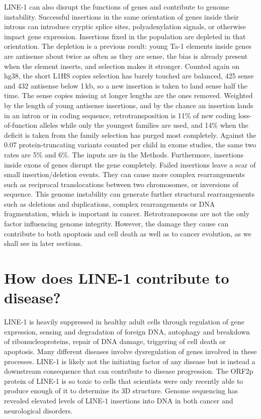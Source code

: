 \documentclass[11pt,twocolumn,twoside]{extarticle}
\begin{document}
LINE-1 can also disrupt the functions of genes and contribute to genome instability. Successful insertions in the same orientation of genes inside their introns can introduce cryptic splice sites, polyadenylation signals, or otherwise impact gene expression\cite{perepelitsa}. Insertions fixed in the population are depleted in that orientation. The depletion is a previous result: young Ta-1 elements inside genes are antisense about twice as often as they are sense\cite{boissinot}, the bias is already present when the element inserts, and selection makes it stronger\cite{sultana}. Counted again on hg38, the short L1HS copies selection has barely touched are balanced, 425 sense and 432 antisense below 1\,kb, so a new insertion is taken to land sense half the time. The sense copies missing at longer lengths are the ones removed. Weighted by the length of young antisense insertions, and by the chance an insertion lands in an intron or in coding sequence, retrotransposition is 11\% of new coding loss-of-function alleles while only the youngest families are used, and 14\% when the deficit is taken from the family selection has purged most completely. Against the 0.07 protein-truncating variants counted per child in exome studies, the same two rates are 5\% and 6\%. The inputs are in the Methods. Furthermore, insertions inside exons of genes disrupt the gene completely\cite{cajuso}. Failed insertions leave a scar of small insertion/deletion events\cite{zhang}. They can cause more complex rearrangements such as reciprocal translocations between two chromosomes, or inversions of sequence\cite{zumalave,mendez}. This genome instability can generate further structural rearrangements such as deletions and duplications, complex rearrangements or DNA fragmentation, which is important in cancer\cite{mendez}. Retrotransposons are not the only factor influencing genome integrity. However, the damage they cause can contribute to both apoptosis and cell death as well as to cancer evolution, as we shall see in later sections.

\section{How does LINE-1 contribute to disease?}
LINE-1 is heavily suppressed in healthy adult cells through regulation of gene expression, sensing and degradation of foreign DNA, autophagy and breakdown of ribonucleoproteins, repair of DNA damage, triggering of cell death or apoptosis\cite{goodier2016}. Many different diseases involve dysregulation of genes involved in these processes. LINE-1 is likely not the initiating factor of any disease but is instead a downstream consequence that can contribute to disease progression. The ORF2p protein of LINE-1 is so toxic to cells that scientists were only recently able to produce enough of it to determine its 3D structure\cite{leslie}. Genome sequencing has revealed elevated levels of LINE-1 insertions into DNA in both cancer and neurological disorders\cite{rodriguez,jacob}.
\end{document}
